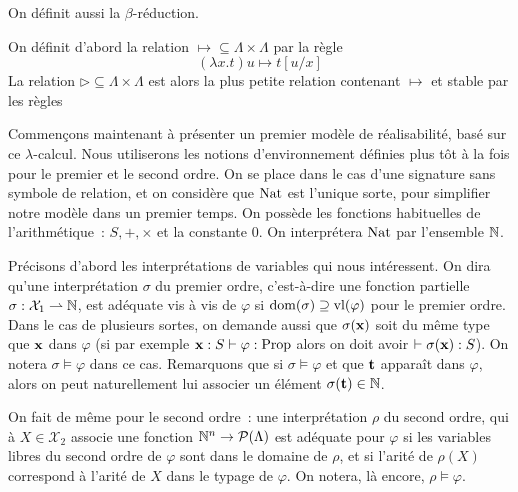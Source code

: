 \documentclass{article}
\begin{document}
On définit aussi la $\beta$-réduction.

\begin{defi}
    On définit d'abord la relation $\mapsto\subseteq \Lambda\times\Lambda$ par la règle
    \[(\lambda x.t)u \mapsto t[u/x]\]
    La relation $\rhd\subseteq \Lambda\times\Lambda$ est alors la plus petite relation contenant $\mapsto$ et stable par les règles
    \begin{center}
        \begin{prooftree}
        \end{prooftree}
        \quad
        \begin{prooftree}
        \end{prooftree}
        \quad
        \begin{prooftree}
        \end{prooftree}
    \end{center}
\end{defi}

Commençons maintenant à présenter un premier modèle de réalisabilité, basé sur ce $\lambda$-calcul. Nous utiliserons les notions d'environnement définies plus tôt à la fois pour le premier et le second ordre. On se place dans le cas d'une signature sans symbole de relation, et on considère que $\Nat$ est l'unique sorte, pour simplifier notre modèle dans un premier temps. On possède les fonctions habituelles de l'arithmétique~: $S,+,\times$ et la constante $0$. On interprétera $\Nat$ par l'ensemble $\bN$.

Précisons d'abord les interprétations de variables qui nous intéressent. On dira qu'une interprétation $\sigma$ du premier ordre, c'est-à-dire une fonction partielle $\sigma : \mathcal X_1 \rightharpoonup \bN$, est adéquate vis à vis de $\varphi$ si $\domm(\sigma) \supseteq\varlib{\varphi}$ pour le premier ordre. Dans le cas de plusieurs sortes, on demande aussi que $\sigma(\bx)$ soit du même type que $\bx$ dans $\varphi$ (si par exemple $\bx : S \vdash \varphi : \Propo$ alors on doit avoir $\vdash \sigma(\bx) : S$). On notera $\sigma\models \varphi$ dans ce cas. Remarquons que si $\sigma \models \varphi$ et que $\bt$ apparaît dans $\varphi$, alors on peut naturellement lui associer un élément $\sigma(\bt) \in \bN$.


On fait de même pour le second ordre~: une interprétation $\rho$ du second ordre, qui à $X \in \mathcal X_2$ associe une fonction $\bN^n \to \mathcal P(\Lambda)$ est adéquate pour $\varphi$ si les variables libres du second ordre de $\varphi$ sont dans le domaine de $\rho$, et si l'arité de $\rho(X)$ correspond à l'arité de $X$ dans le typage de $\varphi$. On notera, là encore, $\rho\models \varphi$.
\end{document}

